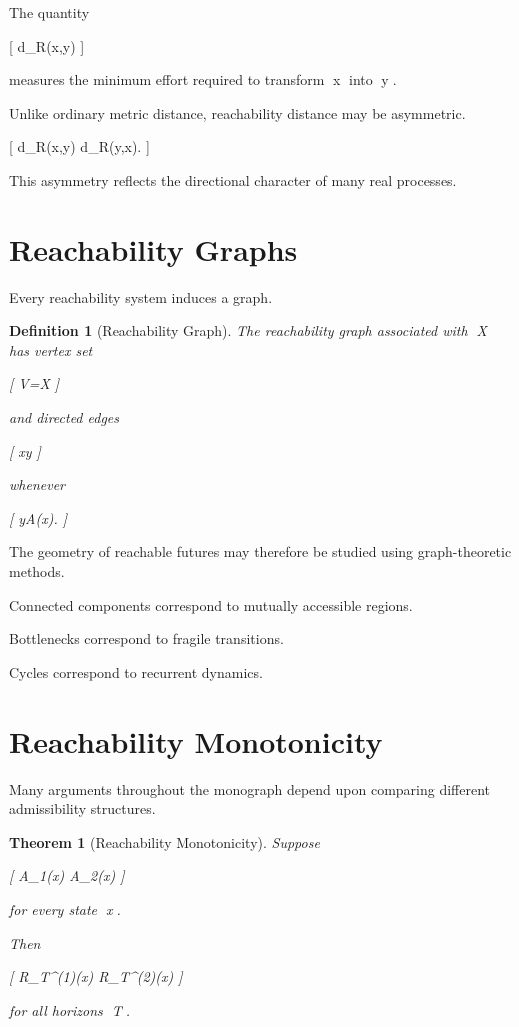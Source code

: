 \documentclass[11pt,oneside,openany]{book}
\newtheorem{definition}{Definition}[chapter] \newtheorem{theorem}{Theorem}[chapter] \newtheorem{proposition}{Proposition}[chapter] \newtheorem{lemma}{Lemma}[chapter] \newtheorem{corollary}{Corollary}[chapter] \newtheorem{remark}{Remark}[chapter]
\begin{document}
The quantity

[
d_R(x,y)
]

measures the minimum effort required to transform x into y.

Unlike ordinary metric distance, reachability distance may be asymmetric.

[
d_R(x,y)
\neq
d_R(y,x).
]

This asymmetry reflects the directional character of many real processes.

\section{Reachability Graphs}

Every reachability system induces a graph.

\begin{definition}[Reachability Graph]

The reachability graph associated with X has vertex set

[
V=X
]

and directed edges

[
x\rightarrow y
]

whenever

[
y\in A(x).
]

\end{definition}

The geometry of reachable futures may therefore be studied using graph-theoretic methods.

Connected components correspond to mutually accessible regions.

Bottlenecks correspond to fragile transitions.

Cycles correspond to recurrent dynamics.

\section{Reachability Monotonicity}

Many arguments throughout the monograph depend upon comparing different admissibility structures.

\begin{theorem}[Reachability Monotonicity]

Suppose

[
A_1(x)
\subseteq
A_2(x)
]

for every state x.

Then

[
R_T^{(1)}(x)
\subseteq
R_T^{(2)}(x)
]

for all horizons T.

\end{theorem}
\end{document}
